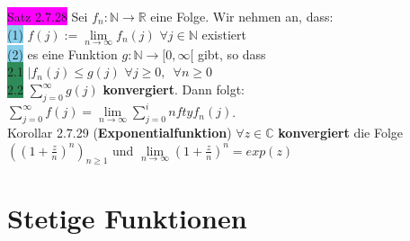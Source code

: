 \documentclass[landscape, 10pt]{article}
\newcommand{\R}{\mathbb{R}}
\newcommand{\N}{\mathbb{N}}
\newcommand{\C}{\mathbb{C}}
\begin{document}
\begin{multicols}{3}
              \colorbox{magenta}{Satz 2.7.28} 
                     Sei \textcolor{NavyBlue}{$f_n:\N\longrightarrow\R$} 
                     eine Folge. Wir nehmen an, dass: \\
                     \colorbox{SkyBlue}{(1)} 
                            \textcolor{NavyBlue}{
                            $f(j):=\lim\limits_{n\to\infty}f_n(j)$\quad
                            $\forall j\in\N$} 
                            existiert \\
                     \colorbox{SkyBlue}{(2)} es eine Funktion 
                            \textcolor{NavyBlue}{
                            $g:\N\longrightarrow[0,\infty[$} gibt,
                            so dass \\
                            \colorbox{SeaGreen}{2.1} 
                                   \textcolor{NavyBlue}{
                                   $|f_n(j)\leqslant g(j)$\quad
                                   $\forall j\geqslant0,\enspace
                                   \forall n\geqslant0$} \\
                            \colorbox{SeaGreen}{2.2}
                                   \textcolor{NavyBlue}{$\sum_{j=0}^\infty g(j)$} 
                                   \textbf{konvergiert}. Dann folgt: 
                                   \textcolor{NavyBlue}{
                                   $\sum_{j=0}^\infty f(j)
                                   =\lim\limits_{n\to\infty}\sum_{j=0}^infty f_n(j)$}.\\
              \colorbox{BurntOrange}{Korollar 2.7.29} 
              (\textbf{Exponentialfunktion})
                     \textcolor{NavyBlue}{
                     $\forall z\in\C$} \textbf{konvergiert} die Folge 
                     \textcolor{NavyBlue}{
                     $((1+\frac{z}{n})^n)_{n\geqslant1}$} und 
                     \textcolor{NavyBlue}{
                     $\lim\limits_{n\to\infty}(1+\frac{z}{n})^n=exp(z)$}

\section{Stetige Funktionen}

\end{multicols}
\end{document}
